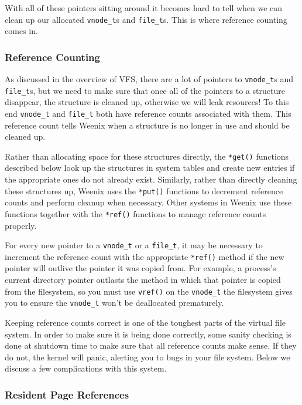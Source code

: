With all of these pointers sitting around it becomes hard to tell when we can clean up our allocated \texttt{vnode\_t}s and \texttt{file\_t}s. This is where reference counting comes in.


\subsubsection{Reference Counting}

As discussed in the overview of VFS, there are a lot of pointers to \texttt{vnode\_t}s and \texttt{file\_t}s, but we need to make sure that once all of the pointers to a structure disappear, the structure is cleaned up, otherwise we will leak resources! To this end \texttt{vnode\_t} and \texttt{file\_t} both have reference counts associated with them. This reference count tells Weenix when a structure is no longer in use and should be cleaned up.

Rather than allocating space for these structures directly, the \texttt{*get()} functions described below look up the structures in system tables and create new entries if the appropriate ones do not already exist. Similarly, rather than directly cleaning these structures up, Weenix uses the \texttt{*put()} functions to decrement reference counts and perform cleanup when necessary. Other systems in Weenix use these functions together with the \texttt{*ref()} functions to manage reference counts properly.

For every new pointer to a \texttt{vnode\_t} or a \texttt{file\_t}, it may be necessary to increment the reference count with the appropriate \texttt{*ref()} method if the new pointer will outlive the pointer it was copied from. For example, a process's current directory pointer outlasts the method in which that pointer is copied from the filesystem, so you must use \texttt{vref()} on the \texttt{vnode\_t} the filesystem gives you to ensure the \texttt{vnode\_t} won't be deallocated prematurely.

Keeping reference counts correct is one of the toughest parts of the virtual file system. In order to make sure it is being done correctly, some sanity checking is done at shutdown time to make sure that all reference counts make sense. If they do not, the kernel will panic, alerting you to bugs in your file system. Below we discuss a few complications with this system.

\subsubsection{Resident Page References}

